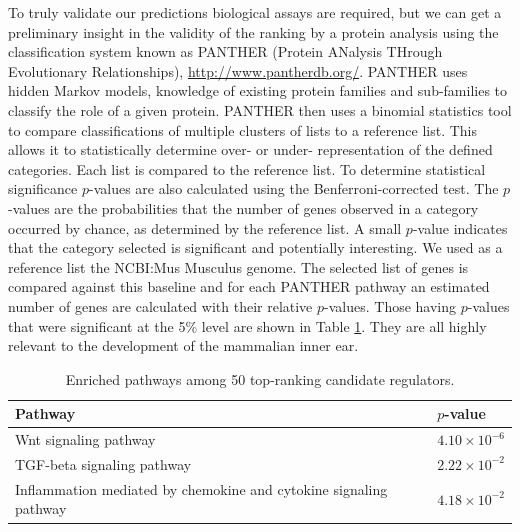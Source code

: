 \documentclass{article}
\begin{document}
To truly validate our  predictions biological assays are required, but
we can get  a preliminary insight in the validity of  the ranking by a
protein  analysis using  the  classification system  known as  PANTHER
(Protein     ANalysis     THrough     Evolutionary     Relationships),
\url{http://www.pantherdb.org/}.   PANTHER uses hidden  Markov models,
knowledge of  existing protein families and  sub-families to classify the
role of a given protein.  PANTHER then uses a binomial statistics tool
to  compare  classifications  of  multiple  clusters  of  lists  to  a
reference  list. This allows  it to  statistically determine  over- or
under- representation of the defined categories. Each list is compared
to   the  reference  list.   To  determine   statistical  significance
$p$-values  are   also  calculated  using   the   Benferroni-corrected
test. The  $p$-values are the  probabilities that the number  of genes
observed  in a  category  occurred  by chance,  as  determined by  the
reference list. A small $p$-value indicates that the category selected
is significant  and potentially interesting.   We used as  a reference
list  the NCBI:Mus  Musculus genome.  The  selected list  of genes  is
compared  against  this  baseline  and  for each  PANTHER  pathway  an
estimated  number   of  genes  are  calculated   with  their  relative
$p$-values. Those  having $p$-values that were significant  at the 5\%
level  are shown  in  Table \ref{tab:pathways}.  They  are all  highly
relevant to the development of the mammalian inner ear.

\begin{table}[tb]
  \caption{Enriched pathways among 50 top-ranking candidate regulators.}
  \label{tab:pathways}
 \centering
  \begin{tabularx}{\columnwidth}{Xl}
    Pathway & $p$-value \\
    \hline
    Wnt signaling pathway &	$4.10\times 10^{-6}$ \\
    TGF-beta signaling pathway & $2.22\times 10^{-2}$ \\
    Inflammation mediated by chemokine and cytokine signaling pathway & $4.18\times 10^{-2}$ \\
  \end{tabularx}
\end{table}
\end{document}
